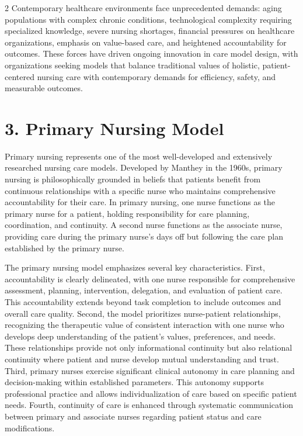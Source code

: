 \documentclass[12pt]{article}
\begin{document}
\begin{multicols}{2}
Contemporary healthcare environments face unprecedented demands: aging populations with complex chronic conditions, technological complexity requiring specialized knowledge, severe nursing shortages, financial pressures on healthcare organizations, emphasis on value-based care, and heightened accountability for outcomes. These forces have driven ongoing innovation in care model design, with organizations seeking models that balance traditional values of holistic, patient-centered nursing care with contemporary demands for efficiency, safety, and measurable outcomes.

\section*{3. \quad Primary Nursing Model}

Primary nursing represents one of the most well-developed and extensively researched nursing care models. Developed by Manthey in the 1960s, primary nursing is philosophically grounded in beliefs that patients benefit from continuous relationships with a specific nurse who maintains comprehensive accountability for their care. In primary nursing, one nurse functions as the primary nurse for a patient, holding responsibility for care planning, coordination, and continuity. A second nurse functions as the associate nurse, providing care during the primary nurse's days off but following the care plan established by the primary nurse.

The primary nursing model emphasizes several key characteristics. First, accountability is clearly delineated, with one nurse responsible for comprehensive assessment, planning, intervention, delegation, and evaluation of patient care. This accountability extends beyond task completion to include outcomes and overall care quality. Second, the model prioritizes nurse-patient relationships, recognizing the therapeutic value of consistent interaction with one nurse who develops deep understanding of the patient's values, preferences, and needs. These relationships provide not only informational continuity but also relational continuity where patient and nurse develop mutual understanding and trust. Third, primary nurses exercise significant clinical autonomy in care planning and decision-making within established parameters. This autonomy supports professional practice and allows individualization of care based on specific patient needs. Fourth, continuity of care is enhanced through systematic communication between primary and associate nurses regarding patient status and care modifications.


\end{multicols}
\end{document}
